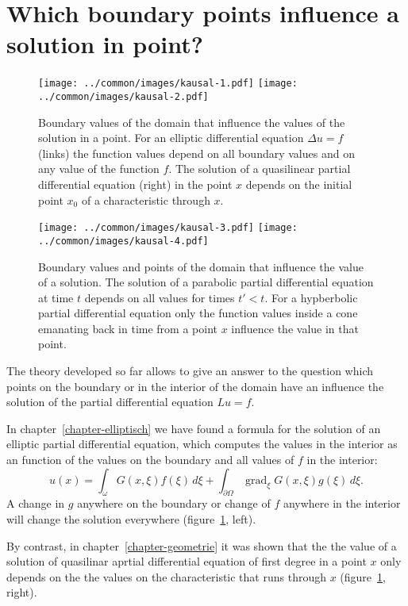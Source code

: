 %
%
%
\section{Which boundary points influence a solution in point?}
\begin{figure}
\centering
\texttt{[image: ../common/images/kausal-1.pdf]}\qquad\qquad%
\texttt{[image: ../common/images/kausal-2.pdf]}
\caption{Boundary values of the domain that influence the values of the
solution in a point.
For an elliptic differential equation $\Delta u=f$
(links)
the function values depend on all boundary values and on any value
of the function $f$.
The solution of a quasilinear partial differential equation (right)
in the point $x$ depends on the initial point $x_0$ of a characteristic
through $x$.
\label{einflussmenge1}}
\end{figure}
\begin{figure}
\centering
\texttt{[image: ../common/images/kausal-3.pdf]}\qquad\qquad%
\texttt{[image: ../common/images/kausal-4.pdf]}
\caption{Boundary values and points of the domain that influence
the value of a solution.
The solution of a parabolic partial differential equation
at time $t$ depends on all values for times $t'<t$.
For a hypberbolic partial differential equation only the function
values inside a cone emanating back in time from a point $x$ 
influence the value in that point.
\label{einflussmenge2}}
\end{figure}
The theory developed so far allows to give an answer to the question
which points on the boundary or in the interior of the domain have
an influence the solution of the partial differential equation
$Lu=f$.

In chapter~\ref{chapter-elliptisch} we have found a formula for the solution
of an elliptic partial differential equation, which computes the 
values in the interior as an function of the values on the boundary
and all values of $f$ in the interior:
\[
u(x)
=
\int_\omega G(x,\xi)f(\xi)\,d\xi
+
\int_{\partial\Omega} \operatorname{grad}_\xi G(x,\xi)g(\xi)\,d\xi.
\]
A change in $g$ anywhere on the boundary or change of $f$ anywhere in the
interior will change the solution everywhere
(figure~\ref{einflussmenge1}, left).

By contrast, in chapter~\ref{chapter-geometrie} it was shown that
the the value of a solution of quasilinar aprtial differential
equation of first degree in a point $x$ only depends on the the values on
the characteristic that runs through $x$
(figure~\ref{einflussmenge1}, right).

